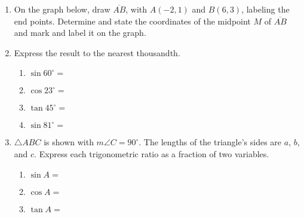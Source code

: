 \documentclass[12pt, twoside]{article}
\begin{document}
\begin{enumerate}
\newpage

    \item On the graph below, draw $\overline{AB}$, with $A(-2,1)$ and $B(6,3)$, labeling the end points. Determine and state the coordinates of the midpoint $M$ of $\overline{AB}$ and mark and label it on the graph.\\
\vspace{2cm}

      \item Express the result to the nearest thousandth.  \vspace{0.5cm}
        \begin{multicols}{2}
          \begin{enumerate}
            \item $\sin 60^\circ = $ \vspace{0.5cm}
            \item $\cos 23^\circ =$
            \item $\tan 45^\circ = $ \vspace{0.5cm}
            \item $\sin 81^\circ =$
          \end{enumerate}
        \end{multicols}

      \item $\triangle ABC$ is shown with $m\angle C=90^\circ$. The lengths of the triangle's sides are $a$, $b$, and $c$. Express each trigonometric ratio as a fraction of two variables. \vspace{1cm}
      \begin{multicols}{2}

          \begin{enumerate}
          \item $\sin A =$ \vspace{0.75cm}
          \item $\cos A =$ \vspace{0.75cm}
          \item $\tan A =$
        \end{enumerate}
    \end{multicols}


\end{enumerate}
\end{document}
